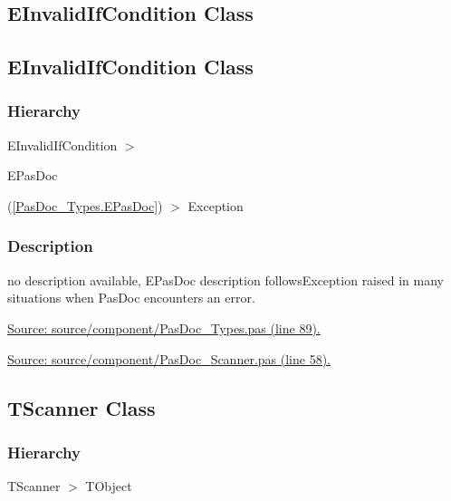 \documentclass{report}
\newif\ifpdf
\begin{document}
\subsection*{\large{\textbf{EInvalidIfCondition Class}}\normalsize\hspace{1ex}\hrulefill}
\else
\subsection*{EInvalidIfCondition Class}
\fi
\label{PasDoc_Scanner.EInvalidIfCondition}
\subsubsection*{\large{\textbf{Hierarchy}}\normalsize\hspace{1ex}\hfill}
EInvalidIfCondition {$>$} \begin{ttfamily}EPasDoc\end{ttfamily}(\ref{PasDoc_Types.EPasDoc}) {$>$} 
Exception
\subsubsection*{\large{\textbf{Description}}\normalsize\hspace{1ex}\hfill}
no description available, EPasDoc description followsException raised in many situations when PasDoc encounters an error.\par
\href{https://github.com/pasdoc/pasdoc/blob/master/source/component/PasDoc_Types.pas#L89}{Source: source/component/PasDoc{\_}Types.pas (line 89).}\par
\href{https://github.com/pasdoc/pasdoc/blob/master/source/component/PasDoc_Scanner.pas#L58}{Source: source/component/PasDoc{\_}Scanner.pas (line 58).}\ifpdf
\subsection*{\large{\textbf{TScanner Class}}\normalsize\hspace{1ex}\hrulefill}
\else
\subsection*{TScanner Class}
\fi
\label{PasDoc_Scanner.TScanner}
\subsubsection*{\large{\textbf{Hierarchy}}\normalsize\hspace{1ex}\hfill}
TScanner {$>$} TObject
\end{document}
